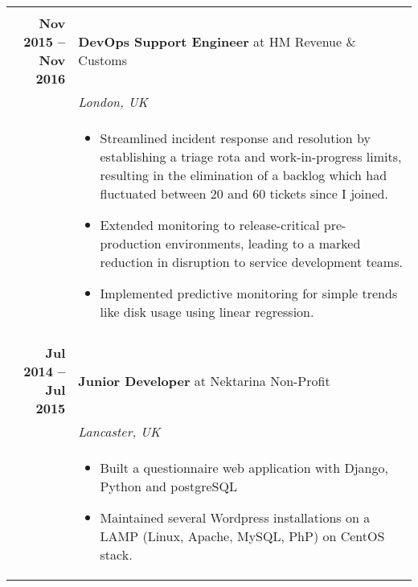 \documentclass[a4paper,10pt]{article} %
\begin{document}
\begin{tabularx}{\textwidth}{r|X}
\multicolumn{2}{r}{} \\ %

\textbf{Nov 2015 -- Nov 2016}       & \textbf{DevOps Support Engineer} at HM Revenue \& Customs \\
                                    & \emph{London, UK} \\
                                    & \footnotesize
    {\begin{itemize}[after=\vspace{-2\baselineskip}]
    \item Streamlined incident response and resolution by establishing a triage
    rota and work-in-progress limits, resulting in the elimination of a backlog
    which had fluctuated between 20 and 60 tickets since I joined.
    \item Extended monitoring to release-critical pre-production environments,
        leading to a marked reduction in disruption to service development
        teams.
    \item Implemented predictive monitoring for simple trends like disk usage
    using linear regression.
    \end{itemize}}\\

\multicolumn{2}{r}{} \\ %

\textbf{Jul 2014 -- Jul 2015}     & \textbf{Junior Developer} at {Nektarina Non-Profit}\\
                                    & \emph{Lancaster, UK}\\
                                    & \footnotesize
    {\begin{itemize}
    \item Built a questionnaire web application with Django, Python and postgreSQL
    \item Maintained several Wordpress installations on a LAMP (Linux, Apache,
    MySQL, PhP) on CentOS stack.
    \end{itemize}}\\

\end{tabularx}

\end{document}
